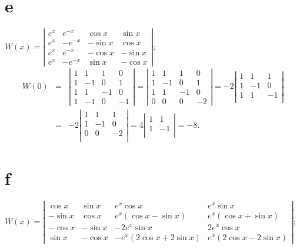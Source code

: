 \documentclass[dvips]{book}
\numberwithin{example}{section}
\numberwithin{equation}{section}
\numberwithin{theorem}{section}
\numberwithin{table}{section}
\numberwithin{figure}{section}
\begin{document}
\part{e}
$
W(x)=\left|\begin{array}{rrrr}e^x&e^{-x}&\cos x&\sin x\\
e^x&-e^{-x}&-\sin x&\cos x\\e^x&e^{-x}&-\cos x&-\sin
x\\e^x&-e^{-x}&\sin x&-\cos x\end{array}\right|;
$
\begin{eqnarray*}
W(0)&=&\left|\begin{array}{rrrr}
1&1&1&0\\1&-1&0&1\\1&1&-1&0\\1&-1&0&-1
\end{array}\right|
=\left|\begin{array}{rrrr}
1&1&1&0\\1&-1&0&1\\1&1&-1&0\\0&0&0&-2
\end{array}\right|
=-2\left|\begin{array}{rrrr}
1&1&1\\1&-1&0\\1&1&-1\\
\end{array}\right|\\
&=&-2\left|\begin{array}{rrrr}
1&1&1\\1&-1&0\\0&0&-2\\
\end{array}\right|
=4\left|\begin{array}{rrrr}
1&1\\1&-1\\\end{array}\right|=-8.
\end{eqnarray*}

\part{f}
$
W(x)=\left|\begin{array}{rrcc}\cos x&\sin x&e^x\cos x&e^x\sin x\\
-\sin x&\cos x&e^x(\cos x-\sin x)&e^x(\cos x+\sin x)\\
-\cos x&-\sin x&-2e^x\sin x&2e^x\cos x\\
\sin x&-\cos x&-e^x(2\cos x+2\sin x)&e^x(2\cos x-2\sin x)
\end{array}\right|;
$
\end{document}
